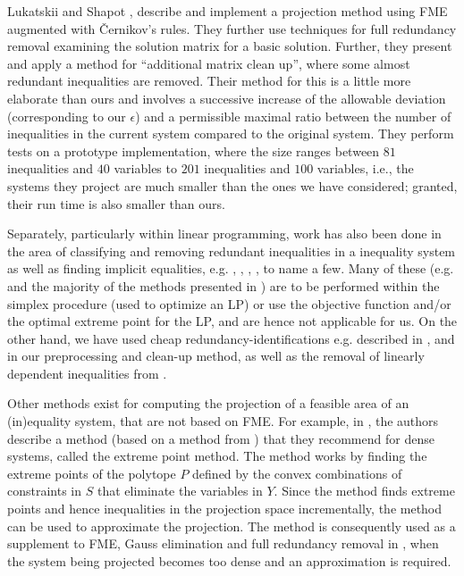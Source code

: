 \documentclass[citeauthoryear]{llncs}
\begin{document}
Lukatskii and Shapot \cite{lukatskii08}, \cite{shapot12} describe and implement a projection method using FME augmented with \v{C}ernikov's rules. They further use techniques for full redundancy removal examining the solution matrix for a basic solution. Further, they present and apply a method for ``additional matrix clean up'', where some almost redundant inequalities are removed. Their method for this is a little more elaborate than ours and involves a successive increase of the allowable deviation (corresponding to our $\epsilon$) and a permissible maximal ratio between the number of inequalities in the current system compared to the original system. They perform tests on a prototype implementation, where the size ranges between $81$ inequalities and $40$ variables to $201$ inequalities and $100$ variables, i.e., the systems they project are much smaller than the ones we have considered; granted, their run time is also smaller than ours. 

Separately, particularly within linear programming, work has also been done in the area of classifying and removing redundant inequalities in a inequality system as well as finding implicit equalities, e.g. \cite{telgen83}, \cite{lassez93}, \cite{karwan83}, \cite{andersen95}, \cite{mattheiss73} to name a few. 
Many of these (e.g. \cite{telgen83} and the {majority} of the methods presented in \cite{karwan83}) are to be performed within the simplex procedure (used to optimize an LP) or use the objective function and/or the optimal extreme point for the LP, and are hence not applicable for us. On the other hand, we have used cheap redundancy-identifications e.g. described in \cite{andersen95}, \cite{brearley75} and \cite{maros} in our preprocessing and clean-up method, as well as the removal of linearly dependent inequalities from \cite{lassez93}.

Other methods exist for computing the projection of a feasible area of an (in)equality system, that are not based on FME. For example, in \cite{huynh92}, the authors describe a method (based on a method from \cite{lassez90}) that they recommend for dense systems, called the extreme point method. The method works by finding the extreme points of the polytope $P$ defined by the convex combinations of constraints in $S$ that eliminate the variables in $Y$. Since the method finds extreme points and hence inequalities in the projection space incrementally, the method can be used to approximate the projection. The method is consequently used as a supplement to FME, Gauss elimination and full redundancy removal in \cite{simon05}, when the system being projected becomes too dense and an approximation is required.
\end{document}
